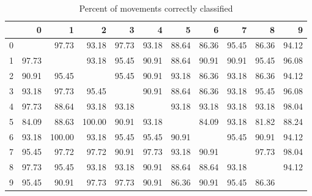 \documentclass[a4paper]{article}
\begin{document}
\begin{table}
  \centering
  \begin{tabular}{r|rrrrrrrrrr}
      & 0 & 1 & 2 & 3 & 4 & 5 & 6 & 7 & 8 & 9 \\
    \hline
    0 &       &  97.73 &  93.18 & 97.73 & 93.18 & 88.64 & 86.36 & 95.45 & 86.36 & 94.12 \\
    1 & 97.73 &        &  93.18 & 95.45 & 90.91 & 88.64 & 90.91 & 90.91 & 95.45 & 96.08 \\
    2 & 90.91 &  95.45 &        & 95.45 & 90.91 & 93.18 & 86.36 & 93.18 & 86.36 & 94.12 \\
    3 & 93.18 &  97.73 &  95.45 &       & 90.91 & 88.64 & 86.36 & 93.18 & 95.45 & 96.08 \\
    4 & 97.73 &  88.64 &  93.18 & 93.18 &       & 93.18 & 93.18 & 93.18 & 93.18 & 98.04 \\
    5 & 84.09 &  88.63 & 100.00 & 90.91 & 93.18 &       & 84.09 & 93.18 & 81.82 & 88.24 \\
    6 & 93.18 & 100.00 &  93.18 & 95.45 & 95.45 & 90.91 &       & 95.45 & 90.91 & 94.12 \\
    7 & 95.45 &  97.72 &  97.72 & 90.91 & 97.73 & 93.18 & 90.91 &       & 97.73 & 98.04 \\
    8 & 97.73 &  95.45 &  93.18 & 93.18 & 90.91 & 88.64 & 88.64 & 93.18 &       & 94.12 \\
    9 & 95.45 &  90.91 &  97.73 & 97.73 & 90.91 & 86.36 & 90.91 & 95.45 & 86.36 \\
  \end{tabular}
  \caption{Percent of movements correctly classified}
  \label{tab:cp}
\end{table}
\end{document}
